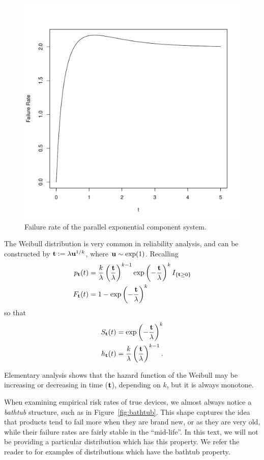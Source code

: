 \begin{figure}[ht]
\centering
\includegraphics[width=0.5\linewidth]{art/hazard}
\caption{Failure rate of the parallel exponential component system.}
\label{fig:hazard_non_monotone}
\end{figure}





\begin{example}
The Weibull distribution is very common in reliability analysis, and can be constructed by 
$\mathbf{t} := \lambda \mathbf{u}^{1/k}$, where $\mathbf{u} \sim \exp(1)$. 
Recalling
\begin{align}
	p_{\mathbf{t}} (t) &= \frac{k}{\lambda}\left(\frac{\mathbf{t}}{\lambda} \right)^{k-1} \exp\left(-\frac{\mathbf{t}}{\lambda} \right)^k  I_{\{ \mathbf{t}\geq 0 \}} \\
	F_{\mathbf{t}} (t) &= 1 - \exp \left(-\frac{\mathbf{t}}{\lambda} \right)^k 
\end{align}
so that 
\begin{align}
	S_{\mathbf{t}} (t) &= \exp \left(-\frac{\mathbf{t}}{\lambda} \right)^k \\
	h_{\mathbf{t}} (t) &= \frac{k}{\lambda} \left(\frac{\mathbf{t}}{\lambda} \right)^{k-1} .
\end{align}
\end{example}
Elementary analysis shows that the hazard function of the Weibull may be increasing or decreasing in time ($\mathbf{t}$), depending on $k$, but it is always monotone.




\begin{example}
When examining empirical risk rates of true devices, we almost always notice a \emph{bathtub} structure, such as in Figure~\ref{fig:bathtub}.
This shape captures the idea that products tend to fail more when they are brand new, or as they are very old, while their failure rates are fairly stable in the ``mid-life''.
In this text, we will not be providing a particular distribution which has this property. 
We refer the reader to \cite{nadarajah_bathtub-shaped_2008} for examples of distributions which have the bathtub property.
\end{example}


